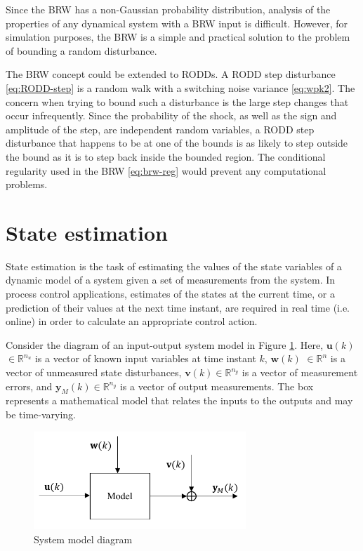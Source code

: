 Since the \gls{BRW} has a non-Gaussian probability distribution, analysis of the properties of any dynamical system with a \gls{BRW} input is difficult. However, for simulation purposes, the \gls{BRW} is a simple and practical solution to the problem of bounding a random disturbance.

The \gls{BRW} concept could be extended to \gls{RODD}s. A \gls{RODD} step disturbance \eqref{eq:RODD-step} is a random walk with a switching noise variance \eqref{eq:wpk2}. The concern when trying to bound such a disturbance is the large step changes that occur infrequently. Since the probability of the shock, as well as the sign and amplitude of the step, are independent random variables, a \gls{RODD} step disturbance that happens to be at one of the bounds is as likely to step outside the bound as it is to step back inside the bounded region. The conditional regularity used in the \gls{BRW} \eqref{eq:brw-reg} would prevent any computational problems.


\section{State estimation} \label{sec:estimation}

State estimation is the task of estimating the values of the state variables of a dynamic model of a system given a set of measurements from the system. In process control applications, estimates of the states at the current time, or a prediction of their values at the next time instant, are required in real time (i.e. online) in order to calculate an appropriate control action.

Consider the diagram of an input-output system model in Figure \ref{fig:model_diag_uwvy}. Here, $\mathbf{u}(k)$ $\in \mathbb{R}^{n_u}$ is a vector of known input variables at time instant $k$, $\mathbf{w}(k)$ $\in \mathbb{R}^n$ is a vector of unmeasured state disturbances, $\mathbf{v}(k) \in \mathbb{R}^{n_y}$ is a vector of measurement errors, and $\mathbf{y}_M(k) \in \mathbb{R}^{n_y}$ is a vector of output measurements. The box represents a mathematical model that relates the inputs to the outputs and may be time-varying.
%
%
%
%
\begin{figure}[ht]
	\centering
	\includegraphics[width=8cm]{images/model_diag_uwvy.pdf}
	\caption{System model diagram}
	\label{fig:model_diag_uwvy}
\end{figure}

